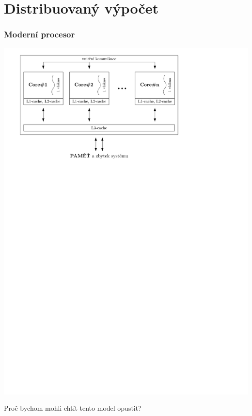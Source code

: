\documentclass[usenames,dvipsnames,9pt]{beamer}
\begin{document}
%

\section{Distribuovaný výpočet}

\begin{frame}
\frametitle{Moderní procesor}
  \centering
  \includegraphics[width=0.8\linewidth]{09/figs/modern_cpu.pdf}

  \pause\vspace{1.5em}
  \Large Proč bychom mohli chtít tento model opustit?


\end{frame}
\end{document}
